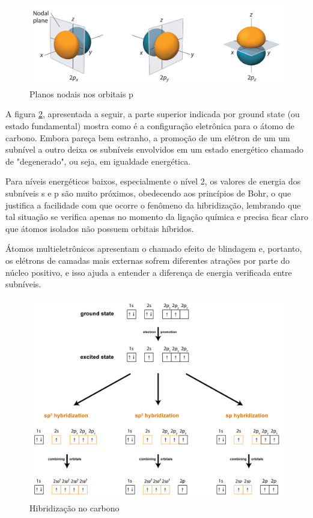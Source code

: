 \documentclass[a4paper,12pt]{book}
\begin{document}
\begin{figure}[h]
	\centering
	\caption{Planos nodais nos orbitais p}
	\vspace{0.25cm}
	\label{fig:orbitaisp}
	\includegraphics[width=\linewidth]{imagens/plano_nodal.jpeg}
\end{figure}

A figura \ref{fig:hibridacao}, apresentada a seguir, a parte superior indicada por ground state (ou estado fundamental) mostra como é a configuração eletrônica para o átomo de carbono. Embora pareça bem estranho, a promoção de um elétron de um um subnível a outro deixa os subníveis envolvidos em um estado energético chamado de "degenerado", ou seja, em igualdade energética.

Para níveis energéticos baixos, especialmente o nível 2, os valores de energia dos subníveis s e p são muito próximos, obedecendo aos princípios de Bohr, o que justifica a facilidade com que ocorre o fenômeno da hibridização, lembrando que tal situação se verifica apenas no momento da ligação química e precisa ficar claro que átomos isolados não possuem orbitais híbridos.

Átomos multieletrônicos apresentam o chamado efeito de blindagem e, portanto, os elétrons de camadas mais externas sofrem diferentes atrações por parte do núcleo positivo, e isso ajuda a entender a diferença de energia verificada entre subníveis.

\begin{figure}[h]
	\centering
	\caption{Hibridização no carbono}
	\vspace{0.25cm}
	\label{fig:hibridacao}
	\includegraphics[width=1\linewidth]{imagens/figura9_hibridacao.png}
\end{figure}
\end{document}
